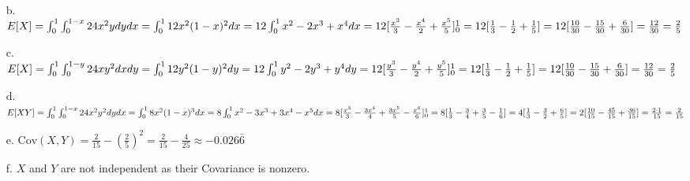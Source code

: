 \documentclass[11pt]{amsart}
\theoremstyle{definition}
\begin{document}
\begin{itemize}
\begin{itemize}
    \item[b.] $E[X]=\int_0^1\int_0^{1-x}24x^2ydydx=\int_0^112x^2(1-x)^2 dx=12\int_0^1x^2-2x^3+x^4dx\\
              =12[\frac{x^3}3-\frac{x^4}2+\frac{x^5}5]_0^1=12[\frac13-\frac12+\frac15]=12[\frac{10}{30}-\frac{15}{30}+\frac6{30}]=\frac{12}{30}=\frac25$

    \item[c.] $E[X]=\int_0^1\int_0^{1-y}24xy^2dxdy=\int_0^112y^2(1-y)^2 dy=12\int_0^1y^2-2y^3+y^4dy\\
              =12[\frac{y^3}3-\frac{y^4}2+\frac{y^5}5]_0^1=12[\frac13-\frac12+\frac15]=12[\frac{10}{30}-\frac{15}{30}+\frac6{30}]=\frac{12}{30}=\frac25$
    
    \item[d.] $E[XY]=\int_0^1\int_0^{1-x}24x^2y^2dydx=\int_0^18x^2(1-x)^3dx\\
              =8\int_0^1x^2-3x^3+3x^4-x^5dx=8[\frac{x^3}3-\frac{3x^4}4+\frac{3x^5}5-\frac{x^6}6]_0^1\\
              =8[\frac13-\frac34+\frac35-\frac16]=4[\frac13-\frac32+\frac65]=2[\frac{10}{15}-\frac{45}{15}+\frac{36}{15}]
              =\frac{2\cdot1}{15}=\frac2{15}$
    
    \item[e.] $\text{Cov}(X,Y)=\frac2{15}-(\frac25)^2=\frac2{15}-\frac4{25}\approx-0.026\bar 6$
    
    \item[f.] $X$ and $Y$ are not independent as their Covariance is nonzero.
    
\end{itemize}

\end{itemize}
\end{document}
